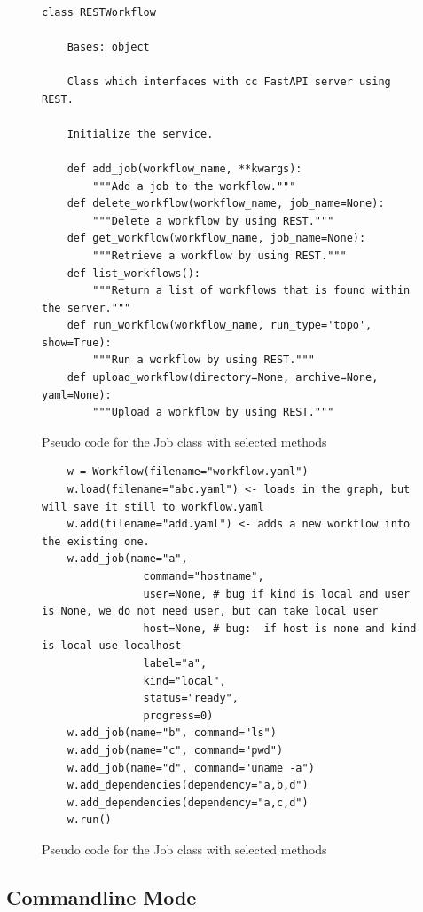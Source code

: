 \begin{figure}[htb]
\caption{Pseudo code for the Job class with selected methods}
\label{fig:code-workflow-rest}
\begin{verbatim}

class RESTWorkflow

    Bases: object

    Class which interfaces with cc FastAPI server using REST.

    Initialize the service.

    def add_job(workflow_name, **kwargs):
        """Add a job to the workflow."""
    def delete_workflow(workflow_name, job_name=None):
        """Delete a workflow by using REST."""
    def get_workflow(workflow_name, job_name=None):
        """Retrieve a workflow by using REST."""
    def list_workflows():
        """Return a list of workflows that is found within the server."""
    def run_workflow(workflow_name, run_type='topo', show=True):
        """Run a workflow by using REST."""
    def upload_workflow(directory=None, archive=None, yaml=None):
        """Upload a workflow by using REST."""
\end{verbatim}
\end{figure}

\begin{figure}[htb]
\caption{Pseudo code for the Job class with selected methods}
\label{fig:code-workflow-example}
\begin{verbatim}
    w = Workflow(filename="workflow.yaml")
    w.load(filename="abc.yaml") <- loads in the graph, but will save it still to workflow.yaml
    w.add(filename="add.yaml") <- adds a new workflow into the existing one.
    w.add_job(name="a",
                command="hostname",
                user=None, # bug if kind is local and user is None, we do not need user, but can take local user
                host=None, # bug:  if host is none and kind is local use localhost
                label="a",
                kind="local",
                status="ready",
                progress=0)
    w.add_job(name="b", command="ls")
    w.add_job(name="c", command="pwd")
    w.add_job(name="d", command="uname -a")
    w.add_dependencies(dependency="a,b,d")
    w.add_dependencies(dependency="a,c,d")
    w.run()
\end{verbatim}
\end{figure}

\subsection{Commandline Mode}

